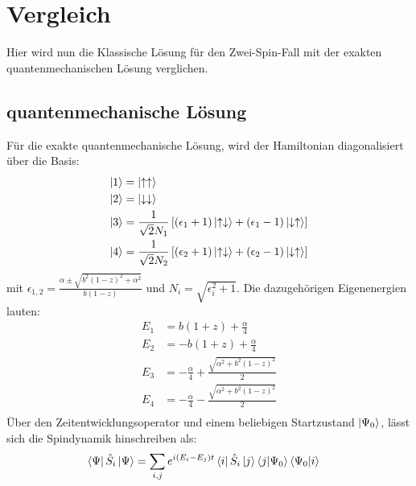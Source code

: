 \chapter{Vergleich}
Hier wird nun die Klassische Lösung für den Zwei-Spin-Fall mit der exakten quantenmechanischen Lösung verglichen.
\section{quantenmechanische Lösung}
Für die exakte quantenmechanische Lösung, wird der Hamiltonian diagonalisiert über die Basis:
\begin{align}
    \ket{1} &= \ket{\uparrow\uparrow}   \\
    \ket{2} &= \ket{\downarrow\downarrow} \\
    \ket{3} &= \frac{1}{\sqrt{2}N_1}\left[(\epsilon_1+1)\ket{\uparrow\downarrow} +(\epsilon_1-1)\ket{\downarrow\uparrow} \right]\\
    \ket{4} &= \frac{1}{\sqrt{2}N_2}\left[(\epsilon_2+1)\ket{\uparrow\downarrow} +(\epsilon_2-1)\ket{\downarrow\uparrow} \right]
\end{align}
mit $\epsilon_{1,2} = \frac{\alpha \pm \sqrt{b^2(1-z)^2+\alpha^2} }{b(1-z)} $ und $N_{i} = \sqrt{\epsilon_i^2 + 1}$. Die dazugehörigen Eigenenergien lauten:
\begin{align}
    E_1 &= b(1+z) + \frac{\alpha}{4}\\
    E_2 &= -b(1+z) + \frac{\alpha}{4}\\
    E_3 &= -\frac{\alpha}{4} + \frac{\sqrt{\alpha^2 + b^2(1-z)^2}}{2}\\
    E_4 &= -\frac{\alpha}{4} - \frac{\sqrt{\alpha^2 + b^2(1-z)^2}}{2}\\
\end{align}
\noindent Über den Zeitentwicklungsoperator und einem beliebigen Startzustand $\ket{\Psi_0}$, lässt sich die Spindynamik hinschreiben als:
\begin{align}
    \bra{\Psi}\hat{S}_i\ket{\Psi} &= \sum_{i,j}e^{i(E_i-E_j)t}\bra{i}\hat{S}_i\ket{j}\bra{j}\ket{\Psi_0}\bra{\Psi_0}\ket{i}
\end{align}
